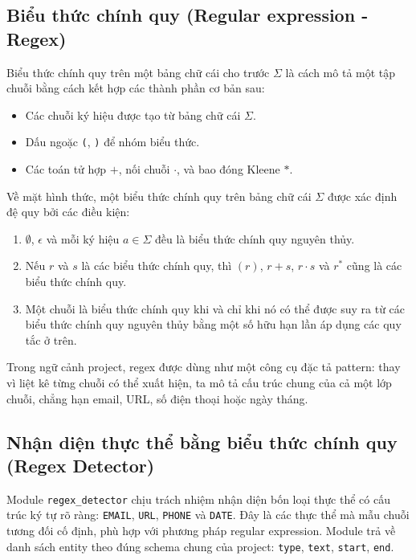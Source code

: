 \subsection{Biểu thức chính quy (Regular expression - Regex)}

Biểu thức chính quy trên một bảng chữ cái cho trước $\Sigma$ là cách mô tả
một tập chuỗi bằng cách kết hợp các thành phần cơ bản sau:\cite{HCMUTautomataslide}

\begin{itemize}[nosep]
      \item Các chuỗi ký hiệu được tạo từ bảng chữ cái $\Sigma$.
      \item Dấu ngoặc \texttt{(}, \texttt{)} để nhóm biểu thức.
      \item Các toán tử hợp $+$, nối chuỗi $\cdot$, và bao đóng Kleene $*$.
\end{itemize}

Về mặt hình thức, một biểu thức chính quy trên bảng chữ cái $\Sigma$ được xác
định đệ quy bởi các điều kiện:

\begin{enumerate}[nosep]
      \item $\emptyset$, $\epsilon$ và mỗi ký hiệu $a \in \Sigma$ đều là biểu
            thức chính quy nguyên thủy.
      \item Nếu $r$ và $s$ là các biểu thức chính quy, thì $(r)$, $r + s$,
            $r \cdot s$ và $r^*$ cũng là các biểu thức chính quy.
      \item Một chuỗi là biểu thức chính quy khi và chỉ khi nó có thể được suy
            ra từ các biểu thức chính quy nguyên thủy bằng một số hữu hạn lần
            áp dụng các quy tắc ở trên.
\end{enumerate}

Trong ngữ cảnh project, regex được dùng như một công cụ đặc tả pattern: thay
vì liệt kê từng chuỗi có thể xuất hiện, ta mô tả cấu trúc chung của cả một lớp
chuỗi, chẳng hạn email, URL, số điện thoại hoặc ngày tháng.

\subsection{Nhận diện thực thể bằng biểu thức chính quy (Regex Detector)}
\label{sec:regex_detector}

Module \texttt{regex\_detector} chịu trách nhiệm nhận diện bốn loại thực thể có
cấu trúc ký tự rõ ràng: \texttt{EMAIL}, \texttt{URL}, \texttt{PHONE} và
\texttt{DATE}. Đây là các thực thể mà mẫu chuỗi tương đối cố định, phù hợp
với phương pháp regular expression. Module trả về danh sách entity theo đúng
schema chung của project: \texttt{type}, \texttt{text}, \texttt{start},
\texttt{end}.

